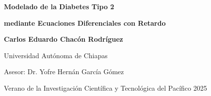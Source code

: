 \begin{titlepage}
\centering


\vspace*{1.5cm}

{\Huge\bfseries Modelado de la Diabetes Tipo 2 \par}
\vspace{0.5cm}
{\Large\bfseries mediante Ecuaciones Diferenciales con Retardo \par}

\vspace{2cm}

{\Large\textbf{Carlos Eduardo Chacón Rodríguez} \par}
{\large Universidad Autónoma de Chiapas \par}

\vspace{1cm}

{\large Asesor: Dr. Yofre Hernán García Gómez \par}

\vfill

{\large Verano de la Investigación Científica y Tecnológica del Pacífico 2025 \par}

\end{titlepage}
